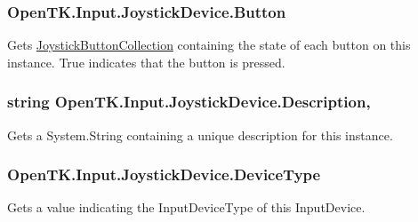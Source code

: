 \hypertarget{class_open_t_k_1_1_input_1_1_joystick_device_afab123d1de6fce4b1ce79a8480d6bc4b}{
\subsubsection[{Button}]{ Open\-T\-K.\-Input.\-Joystick\-Device.\-Button\hspace{0.3cm}{\ttfamily [get]}}}\label{class_open_t_k_1_1_input_1_1_joystick_device_afab123d1de6fce4b1ce79a8480d6bc4b}


Gets \hyperlink{class_open_t_k_1_1_input_1_1_joystick_button_collection}{Joystick\-Button\-Collection} containing the state of each button on this instance. True indicates that the button is pressed. 

\hypertarget{class_open_t_k_1_1_input_1_1_joystick_device_ae04707b3c97c5aeedde335995c1821f6}{
\subsubsection[{Description}]{\setlength{\rightskip}{0pt plus 5cm}string Open\-T\-K.\-Input.\-Joystick\-Device.\-Description\hspace{0.3cm}{\ttfamily [get]}, {\ttfamily [set]}}}\label{class_open_t_k_1_1_input_1_1_joystick_device_ae04707b3c97c5aeedde335995c1821f6}


Gets a System.\-String containing a unique description for this instance. 

\hypertarget{class_open_t_k_1_1_input_1_1_joystick_device_af1eddeb505296cf4a598090113b1f5df}{
\subsubsection[{Device\-Type}]{ Open\-T\-K.\-Input.\-Joystick\-Device.\-Device\-Type\hspace{0.3cm}{\ttfamily [get]}}}\label{class_open_t_k_1_1_input_1_1_joystick_device_af1eddeb505296cf4a598090113b1f5df}


Gets a value indicating the Input\-Device\-Type of this Input\-Device. 

